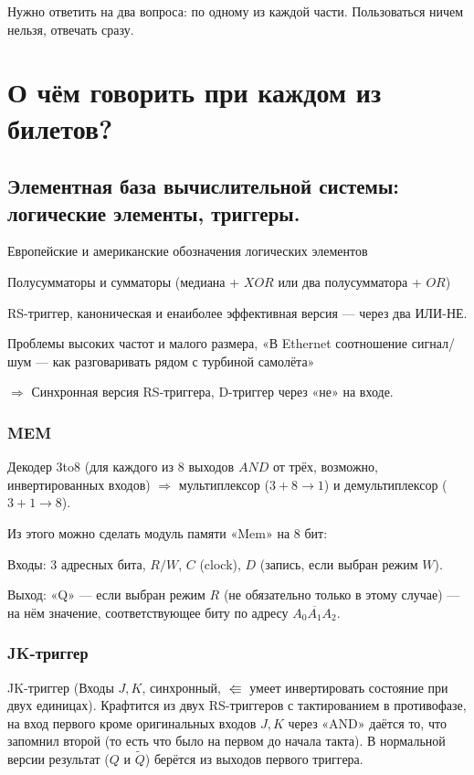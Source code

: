 \documentclass[12pt, a4paper]{article}
\begin{document}
Нужно ответить на два вопроса: по одному из каждой части. Пользоваться ничем нельзя, отвечать сразу.


\section{О чём говорить при каждом из билетов?}


\subsection{Элементная база вычислительной системы: логические элементы, триггеры.}

Европейские и американские обозначения логических элементов

Полусумматоры и сумматоры (медиана + $XOR$ или два полусумматора + $OR$)

RS-триггер, каноническая и енаиболее эффективная версия — через два ИЛИ-НЕ.

Проблемы высоких частот и малого размера, «В Ethernet соотношение сигнал/шум — как разговаривать рядом с турбиной самолёта»

$\Longrightarrow$ Синхронная версия RS-триггера, D-триггер через «не» на входе.



\subsubsection{MEM}

Декодер 3to8 (для каждого из 8 выходов $AND$ от трёх, возможно, инвертированных входов) 
$\Longrightarrow$ мультиплексор ($3 + 8 → 1$) и демультиплексор ($3 + 1 → 8$).

Из этого можно сделать модуль памяти «Mem» на 8 бит: 

Входы: 3 адресных бита, $R/W$, $C$ (clock), $D$ (запись, если выбран режим $W$).

Выход: «Q» — если выбран режим $R$ (не обязательно только в этому случае)
— на нём значение, соответствующее биту по адресу $\overline{A_0 \! A_1 \! A_2}$.


\subsubsection{JK-триггер}

JK-триггер (Входы $J, K$, синхронный, $\Lleftarrow$ умеет инвертировать состояние при двух единицах). 
Крафтится из двух RS-триггеров с тактированием в противофазе, 
на вход первого кроме оригинальных входов $J, K$ через «AND» даётся то, 
что запомнил второй (то есть что было на первом до начала такта).
В нормальной версии результат ($Q$ и $\tilde Q$) берётся из выходов первого триггера.
\end{document}
